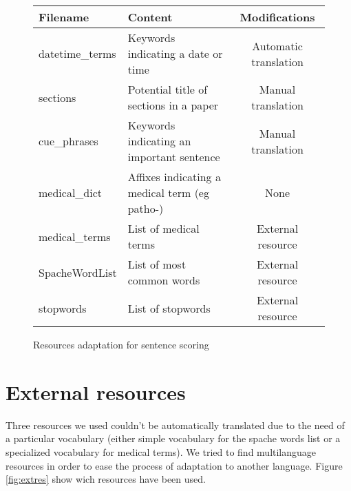 \documentclass[a4paper,10pt]{article}
\begin{document}
\begin{figure}[H]
  \centering
  \begin{tabular}[h]{|l|l|c|}
    \hline
    Filename & Content & Modifications \\
    \hline
    datetime\_terms & Keywords indicating a date or time & Automatic
    translation\\
    sections & Potential title of sections in a paper & Manual
    translation\\
    cue\_phrases & Keywords indicating an important sentence & Manual
    translation\\
    medical\_dict & Affixes indicating a medical term (eg patho-) &
    None\\
    medical\_terms & List of medical terms & External resource\\
    SpacheWordList & List of most common words & External resource\\
    stopwords & List of stopwords & External resource\\
    \hline
    
  \end{tabular}
  \caption{Resources adaptation for sentence scoring}
  \label{fig:frsentscor}
\end{figure}

\section{External resources}
\label{sec:extres}

Three resources we used couldn't be automatically translated due to
the need of a particular vocabulary (either simple vocabulary for the
spache words list or a specialized vocabulary for medical terms). We
tried to find multilanguage resources in order to ease the process of
adaptation to another language. Figure \ref{fig:extres} show wich
resources have been used.
\end{document}
